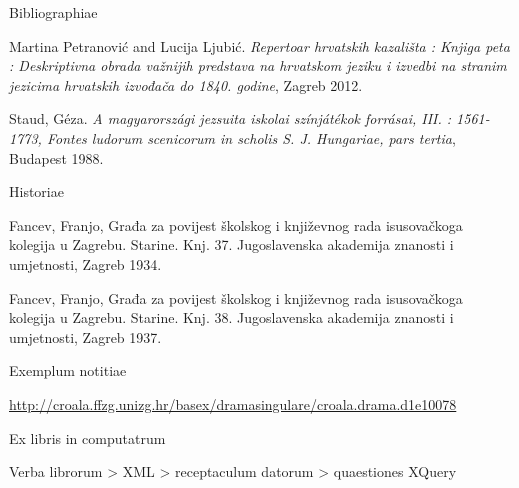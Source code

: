 \documentclass[14pt]{beamer}
\begin{document}
\begin{frame}{Bibliographiae}

Martina Petranović and Lucija Ljubić. \emph{Repertoar hrvatskih kazališta : Knjiga peta : Deskriptivna obrada važnijih predstava na hrvatskom jeziku i izvedbi na stranim jezicima hrvatskih izvođača do 1840. godine}, Zagreb 2012.

Staud, Géza. \emph{A magyarországi jezsuita iskolai színjátékok forrásai, III. : 1561-1773, Fontes ludorum scenicorum in scholis S. J. Hungariae, pars tertia}, Budapest 1988.

\end{frame}
\begin{frame}{Historiae}

Fancev, Franjo, Građa za povijest školskog i književnog rada
isusovačkoga kolegija u Zagrebu. Starine. Knj. 37. Jugoslavenska
akademija znanosti i umjetnosti, Zagreb 1934.

Fancev, Franjo, Građa za povijest školskog i književnog rada
isusovačkoga kolegija u Zagrebu. Starine. Knj. 38. Jugoslavenska
akademija znanosti i umjetnosti, Zagreb 1937.

\end{frame}

\begin{frame}{Exemplum notitiae}

  \url{http://croala.ffzg.unizg.hr/basex/dramasingulare/croala.drama.d1e10078}
  
\end{frame}

{
    \begin{frame}[plain]
    \end{frame}
    }

\begin{frame}{Ex libris in computatrum}

Verba librorum > XML > receptaculum datorum > quaestiones XQuery

\end{frame}

{
    \begin{frame}[plain]
    \end{frame}
    }
\end{document}
